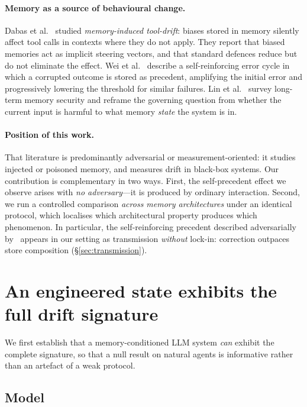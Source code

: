\documentclass[11pt]{article}
\begin{document}
\paragraph{Memory as a source of behavioural change.}
Dabas et al.~\cite{dabas2026tooldrift} studied \emph{memory-induced tool-drift}:
biases stored in memory silently affect tool calls in contexts where they do not
apply. They report that biased memories act as implicit steering vectors, and that
standard defences reduce but do not eliminate the effect. Wei
et al.~\cite{wei2025amemguard} describe a self-reinforcing error cycle in which a
corrupted outcome is stored as precedent, amplifying the initial error and
progressively lowering the threshold for similar failures. Lin
et al.~\cite{lin2026survey} survey long-term memory security and reframe the governing
question from whether the current input is harmful to what memory \emph{state} the
system is in.

\paragraph{Position of this work.}
That literature is predominantly adversarial or measurement-oriented: it studies
injected or poisoned memory, and measures drift in black-box systems. Our contribution
is complementary in two ways. First, the self-precedent effect we observe arises with
\emph{no adversary}---it is produced by ordinary interaction. Second, we run a
controlled comparison \emph{across memory architectures} under an identical protocol,
which localises which architectural property produces which phenomenon. In particular,
the self-reinforcing precedent described adversarially by~\cite{wei2025amemguard}
appears in our setting as transmission \emph{without} lock-in: correction outpaces
store composition (\S\ref{sec:transmission}).

\section{An engineered state exhibits the full drift signature}
\label{sec:engineered}

We first establish that a memory-conditioned LLM system \emph{can} exhibit the
complete signature, so that a null result on natural agents is informative rather than
an artefact of a weak protocol.

\subsection{Model}
\end{document}
